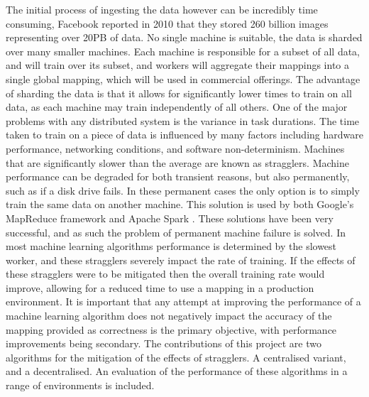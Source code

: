 \documentclass[12pt]{article}
\begin{document}
\newline
\newline
The initial process of ingesting the data however can be incredibly time consuming, Facebook reported in 2010\cite{facebookHaystack} that they stored 260 billion images representing over 20PB of data. No single machine is suitable, the data is sharded over many smaller machines. Each machine is responsible for a subset of all data, and will train over its subset, and workers will aggregate their mappings into a single global mapping, which will be used in commercial offerings. The advantage of sharding the data is that it allows for significantly lower times to train on all data, as each machine may train independently of all others.
\newline
\newline
One of the major problems with any distributed system is the variance in task durations. The time taken to train on a piece of data is influenced by many factors including hardware performance, networking conditions, and software non-determinism. Machines that are significantly slower than the average are known as stragglers. Machine performance can be degraded for both transient reasons, but also permanently, such as if a disk drive fails. In these permanent cases the only option is to simply train the same data on another machine. This solution is used by both Google's MapReduce framework  \citep{dean2008mapreduce} and Apache Spark \cite{zaharia2012resilient}. These solutions have been very successful, and as such the problem of permanent machine failure is solved. 
\newline
\newline
In most machine learning algorithms performance is determined by the slowest worker, and these stragglers severely impact the rate of training. If the effects of these stragglers were to be mitigated then the overall training rate would improve, allowing for a reduced time to use a mapping in a production environment. It is important that any attempt at improving the performance of a machine learning algorithm does not negatively impact the accuracy of the mapping provided as correctness is the primary objective, with performance improvements being secondary.
\newline
\newline
The contributions of this project are two algorithms for the mitigation of the effects of stragglers. A centralised variant, and a decentralised. An evaluation of the performance of these algorithms in a range of environments is included.
\end{document}
